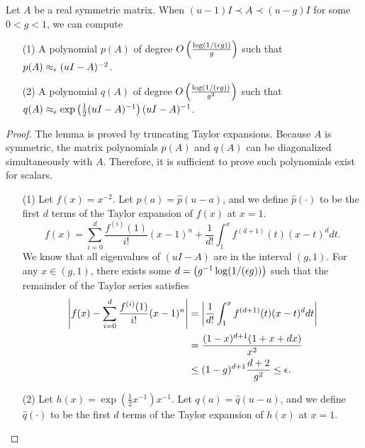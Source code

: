 \begin{lemma}
\label{lem:mat-taylor}
Let $A$ be a real symmetric matrix. When $(u-1) I \prec A \prec (u-g) I$ for some $0 < g < 1$, we can compute
\begin{enumerate}
\item[(1)] A polynomial $p(A)$ of degree $O\left(\frac{\log(1/(\epsilon g))}{g}\right)$ such that $p(A) \approx_{\epsilon} (uI-A)^{-2}$.
\item[(2)] A polynomial $q(A)$ of degree $O\left(\frac{\log(1/(\epsilon g))}{g^2}\right)$ such that $q(A) \approx_{\epsilon} \exp\left(\frac{1}{2}(uI - A)^{-1}\right) (uI-A)^{-1}$.
\end{enumerate}
\end{lemma}
\begin{proof}
The lemma is proved by truncating Taylor expansions.
Because $A$ is symmetric, the matrix polynomials $p(A)$ and $q(A)$ can be diagonalized simultaneously with $A$.
Therefore, it is sufficient to prove such polynomials exist for scalars.

\begin{enumerate}
\item[(1)] Let $f(x) = x^{-2}$. Let $p(a) = \hat p(u-a)$, and we define $\hat p(\cdot)$ to be the first $d$ terms of the Taylor expansion of $f(x)$ at $x=1$.
\[
f(x) = \sum_{i=0}^d \frac{f^{(i)}(1)}{i!}(x-1)^n + \frac{1}{d!} \int_1^{x} f^{(d+1)}(t) (x-t)^d dt.
\]
We know that all eigenvalues of $(uI-A)$ are in the interval $(g, 1)$.
For any $x \in (g, 1)$, there exists some $d = \left(g^{-1} \log(1/(\epsilon g)) \right)$ such that the remainder of the Taylor series satisfies
\begin{align*}
\left| f(x) - \sum_{i=0}^d \frac{f^{(i)}(1)}{i!}(x-1)^n \right|
  & = \left| \frac{1}{d!} \int_1^{x} f^{(d+1)}(t) (x-t)^d dt \right| \\
  & = \frac{(1-x)^{d+1} (1+x+dx)}{x^2} \\
  & \le (1-g)^{d+1}\frac{d+2}{g^2} \le \epsilon.
\end{align*}
\item[(2)] Let $h(x) = \exp\left(\frac{1}{2}x^{-1}\right) x^{-1}$.
Let $q(a) = \hat q(u-a)$, and we define $\hat q(\cdot)$ to be the first $d$ terms of the Taylor expansion of $h(x)$ at $x=1$.


\end{enumerate}
\end{proof}
